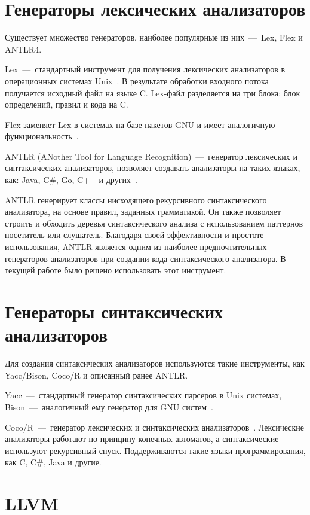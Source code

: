 \section{Генераторы лексических анализаторов}

Существует множество генераторов, наиболее популярные из них~---~Lex, Flex и ANTLR4.

Lex~---~стандартный инструмент для получения лексических анализаторов в операционных системах Unix~\cite{lesk1975lex}. 
В результате обработки входного потока получается исходный файл на языке C. 
Lex-файл разделяется на три блока: блок определений, правил и кода на C.

Flex заменяет Lex в системах на базе пакетов GNU и имеет аналогичную функциональность~\cite{sampath2007test}.

ANTLR (ANother Tool for Language Recognition)~---~генератор лексических и синтаксических анализаторов, позволяет создавать анализаторы на таких языках, как: Java, C\#, Go, C++ и других~\cite{parr2004s}.

ANTLR генерирует классы нисходящего рекурсивного синтаксического анализатора, на основе правил, заданных грамматикой. 
Он также позволяет строить и обходить деревья синтаксического анализа с использованием паттернов посетитель или слушатель. 
Благодаря своей эффективности и простоте использования, ANTLR является одним из наиболее предпочтительных генераторов анализаторов при создании кода синтаксического анализатора. 
В текущей работе было решено использовать этот инструмент.

\section{Генераторы синтаксических анализаторов}

Для создания синтаксических анализаторов используются такие инструменты, как Yacc/Bison, Coco/R и описанный ранее ANTLR.

Yacc~---~стандартный генератор синтаксических парсеров в Unix системах, Bison~---~аналогичный ему генератор для GNU систем~\cite{yacc}.

Coco/R~---~генератор лексических и синтаксических анализаторов~\cite{mossenbock2003compilergenerator}. 
Лексические анализаторы работают по принципу конечных автоматов, а синтаксические используют рекурсивный спуск. 
Поддерживаются такие языки программирования, как C\+\+, C\#, Java и другие.

\section{LLVM}

